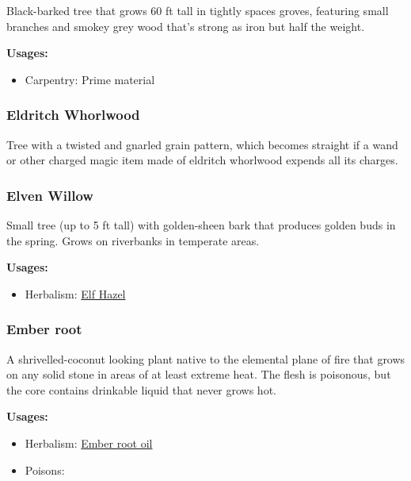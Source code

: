 Black-barked tree that grows 60 ft tall in tightly spaces groves, featuring small branches and smokey grey wood that's strong as iron  but half the weight.

\vspace{5mm}

\textbf{Usages:}

\begin{itemize}[noitemsep]
\item[] Carpentry: Prime material
\end{itemize}


\subsubsection{Eldritch Whorlwood}

Tree with a twisted and gnarled grain pattern, which becomes straight if a wand or other charged magic item made of eldritch whorlwood expends all its charges.

\subsubsection{Elven Willow}
\label{Elven Willow}

Small tree (up to 5 ft tall) with golden-sheen bark that produces golden buds in the spring. Grows on riverbanks in temperate areas.

\vspace{5mm}

\textbf{Usages:}

\begin{itemize}[noitemsep]
\item[] Herbalism: \hyperref[Elf Hazel]{Elf Hazel}
\end{itemize}

\subsubsection{Ember root}
\label{Ember root}

A shrivelled-coconut looking plant native to the elemental plane of fire that grows on any solid stone in areas of at least extreme heat. The flesh is poisonous, but the core contains drinkable liquid that never grows hot.

\vspace{5mm}

\textbf{Usages:}

\begin{itemize}[noitemsep]
\item[] Herbalism: \hyperref[Ember root oil]{Ember root oil}
\item[] Poisons: \poison
\end{itemize}

